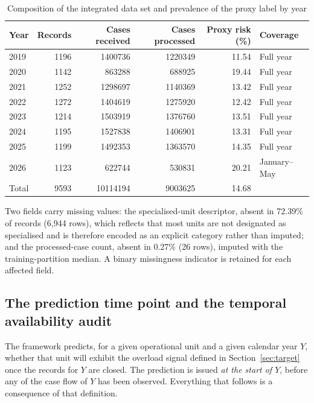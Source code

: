 \documentclass[sn-vancouver,Numbered]{sn-jnl}
\begin{document}
\begin{table}[h]
\caption{Composition of the integrated data set and prevalence of the proxy label by year}\label{tab:dataset}
\begin{tabular}{lrrrrl}
\toprule
Year & Records & Cases received & Cases processed & Proxy risk (\%) & Coverage \\
\midrule
2019 & 1196 & 1400736 & 1220349 & 11.54 & Full year \\
2020 & 1142 & 863288 & 688925 & 19.44 & Full year \\
2021 & 1252 & 1298697 & 1140369 & 13.42 & Full year \\
2022 & 1272 & 1404619 & 1275920 & 12.42 & Full year \\
2023 & 1214 & 1503919 & 1376760 & 13.51 & Full year \\
2024 & 1195 & 1527838 & 1406901 & 13.31 & Full year \\
2025 & 1199 & 1492353 & 1363570 & 14.35 & Full year \\
2026 & 1123 & 622744 & 530831 & 20.21 & January--May \\
\midrule
Total & 9593 & 10114194 & 9003625 & 14.68 & \\
\bottomrule
\end{tabular}
\end{table}

Two fields carry missing values: the specialised-unit descriptor, absent in 72.39\% of records (6{,}944 rows), which reflects that most units are not designated as specialised and is therefore encoded as an explicit category rather than imputed; and the processed-case count, absent in 0.27\% (26 rows), imputed with the training-partition median. A binary missingness indicator is retained for each affected field.

\subsection{The prediction time point and the temporal availability audit}\label{sec:availability}

The framework predicts, for a given operational unit and a given calendar year $Y$, whether that unit will exhibit the overload signal defined in Section~\ref{sec:target} once the records for $Y$ are closed. The prediction is issued \emph{at the start of $Y$}, before any of the case flow of $Y$ has been observed. Everything that follows is a consequence of that definition.
\end{document}
